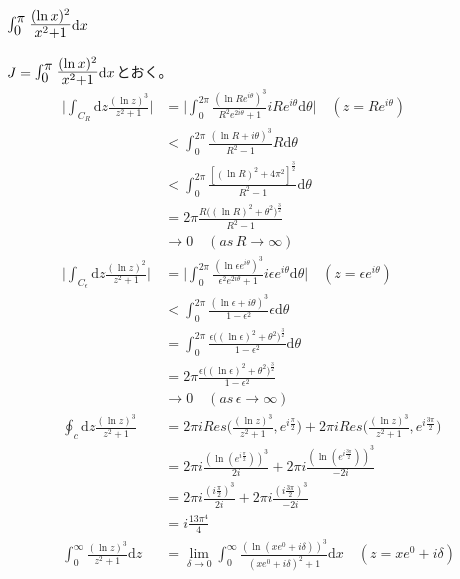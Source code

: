 \documentclass[dvipdfmx,a4paper]{jsarticle}
\begin{document}
\subsection{$\mbox{\Large $\int_0^{\pi}\frac{(\ln{x})^2}{x^2 + 1}$}\mathrm{d}x$}
$J = \mbox{\Large $\int_0^{\pi}\frac{(\ln{x})^2}{x^2 + 1}$}\mathrm{d}x$とおく。
 \begin{align*}
 \biggl|\int_{C_R}\mathrm{d}z\frac{(\ln{z})^3}{z^2 + 1}\biggr| &= \biggl|\int_0^{2\pi}\frac{(\ln{Re^{i\theta}})^3}{R^2e^{2i\theta} + 1}iRe^{i\theta}\mathrm{d}\theta\biggr|\quad(z = Re^{i\theta})\\
 &< \int_0^{2\pi}\frac{(\ln{R} + i\theta)^3}{R^2 - 1}R\mathrm{d}\theta\\
 &< \int_0^{2\pi}\frac{[(\ln{R})^2 + 4\pi^2]^{\frac{3}{2}}}{R^2 - 1}\mathrm{d}\theta\\
 &=2\pi\frac{R\bigl((\ln{R})^2 + \theta^2\bigr)^{\frac{3}{2}}}{R^2 - 1}\\
 &\to 0 \quad(as\, R \to \infty)\\
 \biggl|\int_{C_{\epsilon}}\mathrm{d}z\frac{(\ln{z})^2}{z^2 + 1}\biggr| &= \biggl|\int_0^{2\pi}\frac{(\ln{\epsilon e^{i\theta}})^3}{\epsilon^2e^{2i\theta} + 1}i\epsilon e^{i\theta}\mathrm{d}\theta\biggr|\quad(z = \epsilon e^{i\theta})\\
 &< \int_0^{2\pi}\frac{(\ln{\epsilon} + i\theta)^3}{1 - \epsilon^2}\epsilon\mathrm{d}\theta\\
 &= \int_0^{2\pi}\frac{\epsilon\bigl((\ln{\epsilon})^2 + \theta^2\bigr)^{\frac{3}{2}}}{1 - \epsilon^2}\mathrm{d}\theta\\
 &=2\pi\frac{\epsilon\bigl((\ln{\epsilon})^2 + \theta^2\bigr)^{\frac{3}{2}}}{1 - \epsilon^2}\\
 &\to 0 \quad(as\, \epsilon \to \infty)\\
 \oint_c\mathrm{d}z\frac{(\ln{z})^3}{z^2 + 1} &= 2\pi iRes\biggl(\frac{(\ln{z})^3}{z^2 + 1}, e^{i\frac{\pi}{2}}\biggr) + 2\pi iRes\biggl(\frac{(\ln{z})^3}{z^2 + 1}, e^{i\frac{3\pi}{2}}\biggr)\\
 &= 2\pi i \frac{(\ln{(e^{i\frac{\pi}{2}})})^3}{2i} + 2\pi i \frac{(\ln{(e^{i\frac{3\pi}{2}})})^3}{ -2i}\\
 &= 2\pi i \frac{(i\frac{\pi}{2})^3}{2i} + 2\pi i \frac{(i\frac{3\pi}{2})^3}{ -2i}\\
 &= i\frac{13\pi^4}{4}\\
  \int_{0}^{\infty} \frac{(\ln{z})^3}{z^2 + 1} \mathrm{d}z &= \lim_{\delta \to 0}\int_{0}^{\infty} \frac{(\ln{(xe^0 + i\delta)})^3}{(xe^0 + i\delta)^2 + 1} \mathrm{d}x \quad(z = xe^0 + i\delta)\\

\end{align*}
\end{document}
